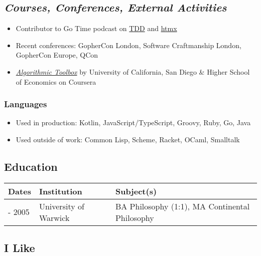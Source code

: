 \subsection{\texorpdfstring{\emph{Courses, Conferences, External
Activities}}{Courses, Conferences, External Activities}}\label{courses-conferences-external-activities}

\begin{itemize}
\tightlist
\item
  Contributor to Go Time podcast on
  \href{https://changelog.com/gotime/185}{TDD} and
  \href{https://changelog.com/gotime/266}{htmx}
\item
  Recent conferences: GopherCon London, Software Craftmanship London,
  GopherCon Europe, QCon
\item
  \href{https://www.coursera.org/account/accomplishments/records/C58NGM7GQS84}{\emph{Algorithmic
  Toolbox}} by University of California, San Diego \& Higher School of
  Economics on Coursera
\end{itemize}

\subsubsection{Languages}\label{languages}

\begin{itemize}
\tightlist
\item
  Used in production: Kotlin, JavaScript/TypeScript, Groovy, Ruby, Go,
  Java
\item
  Used outside of work: Common Lisp, Scheme, Racket, OCaml, Smalltalk
\end{itemize}

\subsection{Education}\label{education}

\begin{longtable}[]{@{}lll@{}}
\toprule\noalign{}
Dates & Institution & Subject(s) \\
\midrule\noalign{}
\endhead
\bottomrule\noalign{}
\endlastfoot
2000 - 2005 & University of Warwick & BA Philosophy (1:1), MA
Continental Philosophy \\
\end{longtable}

\subsection{I Like}\label{i-like}

